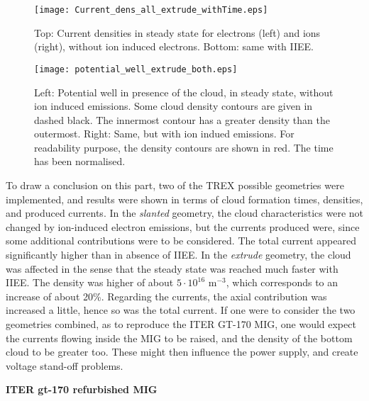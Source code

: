 \begin{figure}[h!]
\centering
	\texttt{[image: Current\_dens\_all\_extrude\_withTime.eps]}
	\caption{\label{Current_dens_all_extrude}Top: Current densities in steady state for electrons (left) and ions (right), without ion induced electrons. Bottom: same with IIEE. }
\end{figure}


\begin{figure}[h!]
\centering
	\texttt{[image: potential\_well\_extrude\_both.eps]}
	\caption{\label{potential_well_extrude_both} Left: Potential well in presence of the cloud, in steady state, without ion induced emissions. Some cloud density contours are given in dashed black. The innermost contour has a greater density than the outermost. Right: Same, but with ion indued emissions. For readability purpose, the density contours are shown in red. The time has been normalised.}
\end{figure}

To draw a conclusion on this part, two of the TREX possible geometries were implemented, and results were shown in terms of cloud formation times, densities, and produced currents. In the \emph{slanted} geometry, the cloud characteristics were not changed by ion-induced electron emissions, but the currents produced were, since some additional contributions were to be considered. The total current appeared significantly higher than in absence of IIEE. In the \emph{extrude} geometry, the cloud was affected in the sense that the steady state was reached much faster with IIEE. The density was higher of about $5\cdot 10^{16}$ m$^{-3}$, which corresponds to an increase of about 20\%. Regarding the currents, the axial contribution was increased a little, hence so was the total current. If one were to consider the two geometries combined, as to reproduce the ITER GT-170 MIG, one would expect the currents flowing inside the MIG to be raised, and the density of the bottom cloud to be greater too. These might then influence the power supply, and create voltage stand-off problems.\\ 

\newpage

\textbf{ITER gt-170 refurbished MIG}\\

